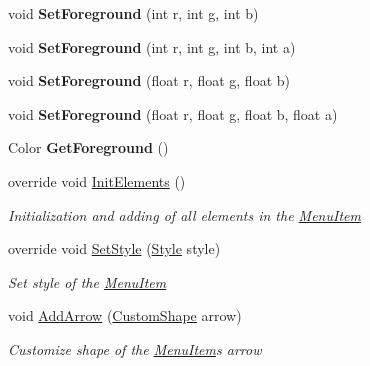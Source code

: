 \begin{DoxyCompactItemize}
\mbox{\label{class_space_v_i_l_1_1_menu_item_a5aceeddbc86e063accdd29f91a3ba42a}} 
void {\bfseries Set\+Foreground} (int r, int g, int b)
\item 
\mbox{\label{class_space_v_i_l_1_1_menu_item_a85652f31f3ab6192ffbca22841b44ea2}} 
void {\bfseries Set\+Foreground} (int r, int g, int b, int a)
\item 
\mbox{\label{class_space_v_i_l_1_1_menu_item_ad84473f572fdb8a0ce39ec1aeeb678a9}} 
void {\bfseries Set\+Foreground} (float r, float g, float b)
\item 
\mbox{\label{class_space_v_i_l_1_1_menu_item_ac29025d8772135b9cdf0e7790e47fe81}} 
void {\bfseries Set\+Foreground} (float r, float g, float b, float a)
\item 
\mbox{\label{class_space_v_i_l_1_1_menu_item_a7aa3ff32dc812b34f88ae7090febd741}} 
Color {\bfseries Get\+Foreground} ()
\item 
override void \mbox{\hyperlink{class_space_v_i_l_1_1_menu_item_a69732e6cf64ca11da0d3beef91e8c086}{Init\+Elements}} ()
\begin{DoxyCompactList}\small\item\em Initialization and adding of all elements in the \mbox{\hyperlink{class_space_v_i_l_1_1_menu_item}{Menu\+Item}} \end{DoxyCompactList}\item 
override void \mbox{\hyperlink{class_space_v_i_l_1_1_menu_item_a836d866b3d92b8217a49ddd19b0a35f5}{Set\+Style}} (\mbox{\hyperlink{class_space_v_i_l_1_1_decorations_1_1_style}{Style}} style)
\begin{DoxyCompactList}\small\item\em Set style of the \mbox{\hyperlink{class_space_v_i_l_1_1_menu_item}{Menu\+Item}} \end{DoxyCompactList}\item 
void \mbox{\hyperlink{class_space_v_i_l_1_1_menu_item_a54c3c774c9108d3bd599b4e464f7fcd1}{Add\+Arrow}} (\mbox{\hyperlink{class_space_v_i_l_1_1_custom_shape}{Custom\+Shape}} arrow)
\begin{DoxyCompactList}\small\item\em Customize shape of the \mbox{\hyperlink{class_space_v_i_l_1_1_menu_item}{Menu\+Item}}\textquotesingle{}s arrow \end{DoxyCompactList}\item 

\end{DoxyCompactItemize}
